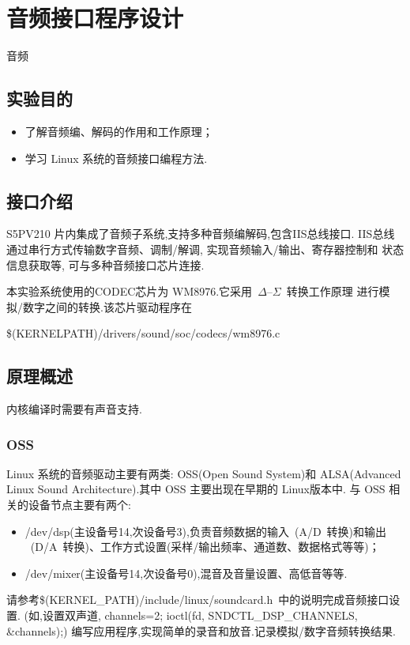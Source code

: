 \chapter{音频接口程序设计}{音频}

\section{实验目的}
\begin{itemize}\itemsep=-3pt
  \item 了解音频编、解码的作用和工作原理；
  \item 学习 Linux 系统的音频接口编程方法.
\end{itemize}

\section{接口介绍}
	S5PV210 片内集成了音频子系统,支持多种音频编解码,包含IIS总线接口.
IIS总线通过串行方式传输数字音频、调制/解调, 实现音频输入/输出、寄存器控制和
状态信息获取等, 可与多种音频接口芯片连接.

	本实验系统使用的CODEC芯片为 WM8976.它采用~$\Delta$--$\Sigma$~转换工作原理
进行模拟/数字之间的转换.该芯片驱动程序在

  \$(KERNELPATH)/drivers/sound/soc/codecs/wm8976.c

\section{原理概述}
	内核编译时需要有声音支持.

\subsection{OSS}
	Linux 系统的音频驱动主要有两类: OSS(Open Sound System)和 ALSA(Advanced
Linux Sound Architecture).其中 OSS 主要出现在早期的 Linux版本中.
与 OSS 相关的设备节点主要有两个:

\begin{itemize}\itemsep=-3pt
  \item /dev/dsp(主设备号14,次设备号3),负责音频数据的输入~(A/D~转换)和输出
		~(D/A~转换)、工作方式设置(采样/输出频率、通道数、数据格式等等)；
  \item /dev/mixer(主设备号14,次设备号0),混音及音量设置、高低音等等.
\end{itemize}

	请参考\$(KERNEL\_PATH)/include/linux/soundcard.h~中的说明完成音频接口设置.
(如,设置双声道, channels=2; ioctl(fd, SNDCTL\_DSP\_CHANNELS, \&channels);)
编写应用程序,实现简单的录音和放音.记录模拟/数字音频转换结果.

